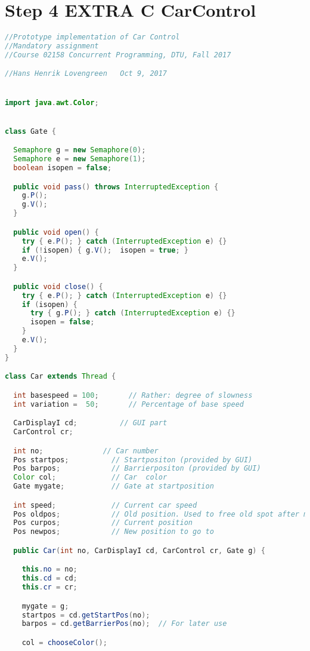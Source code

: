 \section*{Step 4 EXTRA C CarControl}
\begin{lstlisting}[language=java]
//Prototype implementation of Car Control
//Mandatory assignment
//Course 02158 Concurrent Programming, DTU, Fall 2017

//Hans Henrik Lovengreen   Oct 9, 2017


import java.awt.Color;


class Gate {

  Semaphore g = new Semaphore(0);
  Semaphore e = new Semaphore(1);
  boolean isopen = false;

  public void pass() throws InterruptedException {
    g.P(); 
    g.V();
  }

  public void open() {
    try { e.P(); } catch (InterruptedException e) {}
    if (!isopen) { g.V();  isopen = true; }
    e.V();
  }

  public void close() {
    try { e.P(); } catch (InterruptedException e) {}
    if (isopen) { 
      try { g.P(); } catch (InterruptedException e) {}
      isopen = false;
    }
    e.V();
  }
}

class Car extends Thread {

  int basespeed = 100;       // Rather: degree of slowness
  int variation =  50;       // Percentage of base speed

  CarDisplayI cd;          // GUI part
  CarControl cr;

  int no;              // Car number
  Pos startpos;          // Startpositon (provided by GUI)
  Pos barpos;            // Barrierpositon (provided by GUI)
  Color col;             // Car  color
  Gate mygate;           // Gate at startposition

  int speed;             // Current car speed
  Pos oldpos;            // Old position. Used to free old spot after move.
  Pos curpos;            // Current position 
  Pos newpos;            // New position to go to

  public Car(int no, CarDisplayI cd, CarControl cr, Gate g) {

    this.no = no;
    this.cd = cd;
    this.cr = cr;

    mygate = g;
    startpos = cd.getStartPos(no);
    barpos = cd.getBarrierPos(no);  // For later use

    col = chooseColor();


\end{lstlisting}
